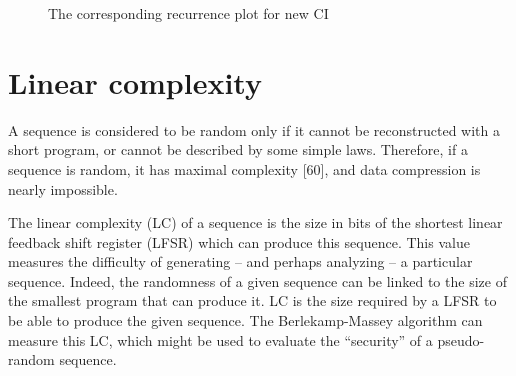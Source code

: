 \begin{figure}
{} \hspace{0.5cm}
 \hspace{0.5cm}
\caption{The corresponding recurrence plot for new CI}
\label{The corresponding recurrence plot for new CI}
\end{figure}


\section{Linear complexity}
A sequence is considered to be random only if it cannot be
reconstructed with a short program, or cannot be described by some simple laws. Therefore, if
a sequence is random, it has maximal complexity [60], and data compression is nearly
impossible.

The linear complexity (LC) of a sequence is the size in bits of the shortest linear feedback shift register (LFSR) which can produce this sequence. This value measures the difficulty of generating -- and perhaps analyzing -- a particular sequence.
Indeed, the randomness of a given sequence can be linked to the size of the smallest program that can produce it. LC is the size required by a LFSR to be able to produce the given sequence. The Berlekamp-Massey algorithm can measure this LC, which might be used to evaluate the ``security'' of a pseudo-random sequence.

